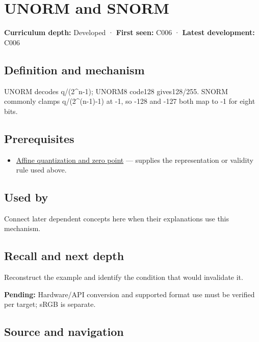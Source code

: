 \hypertarget{appendix-b2402c453dac}{}\label{referencestart:appendix-b2402c453dac}
\section{UNORM and SNORM}\label{appendix-b2402c453dac-unorm-and-snorm}

\textbf{Curriculum depth:} Developed · \textbf{First seen:} C006 · \textbf{Latest development:} C006

\subsection{Definition and mechanism}\label{appendix-b2402c453dac-definition-and-mechanism}

UNORM decodes q/(2\^{}n-1); UNORM8 code128 gives128/255. SNORM commonly clamps q/(2\^{}(n-1)-1) at -1, so -128 and -127 both map to -1 for eight bits.

\subsection{Prerequisites}\label{appendix-b2402c453dac-prerequisites}

\begin{itemize}
\tightlist
\item
  \hyperref[appendix-d5da3eaabaef]{Affine quantization and zero point} --- supplies the representation or validity rule used above.
\end{itemize}

\subsection{Used by}\label{appendix-b2402c453dac-used-by}

Connect later dependent concepts here when their explanations use this mechanism.

\subsection{Recall and next depth}\label{appendix-b2402c453dac-recall-and-next-depth}

Reconstruct the example and identify the condition that would invalidate it.

\textbf{Pending:} Hardware/API conversion and supported format use must be verified per target; sRGB is separate.

\subsection{Source and navigation}\label{appendix-b2402c453dac-source-and-navigation}

